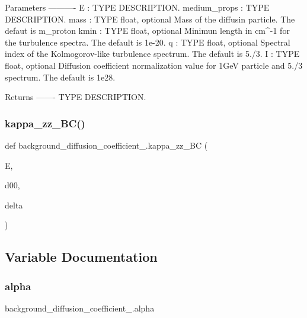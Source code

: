 \begin{DoxyVerb}Parameters
----------
E : TYPE
    DESCRIPTION.
medium_props : TYPE
    DESCRIPTION.
mass : TYPE float, optional
    Mass of the diffusin particle. The defaut is m_proton
kmin : TYPE float, optional
    Minimun length in cm^-1 for the turbulence spectra. The default is 1e-20.
q : TYPE float, optional
    Spectral index of the Kolmogorov-like turbulence 
    spectrum. The default is 5./3.
I : TYPE float, optional
    Diffusion coefficient normalization value for 1GeV particle and 5./3 spectrum. The default is 1e28.

Returns
-------
TYPE
    DESCRIPTION.\end{DoxyVerb}
 \mbox{\label{namespacebackground__diffusion__coefficient__3_a10fb81ef6f3b3cf86b94cf348e5a2c4e}} 
\subsubsection{\texorpdfstring{kappa\+\_\+zz\+\_\+\+B\+C()}{kappa\_zz\_BC()}}
{\footnotesize\ttfamily def background\+\_\+diffusion\+\_\+coefficient\+\_.\+kappa\+\_\+zz\+\_\+\+BC (\begin{DoxyParamCaption}\item[{}]{E,  }\item[{}]{d00,  }\item[{}]{delta }\end{DoxyParamCaption})}



\subsection{Variable Documentation}
\mbox{\label{namespacebackground__diffusion__coefficient__3_a73c0c5f5d27a05d2a555648f133a700b}} 
\subsubsection{\texorpdfstring{alpha}{alpha}}
{\footnotesize\ttfamily background\+\_\+diffusion\+\_\+coefficient\+\_.\+alpha}

